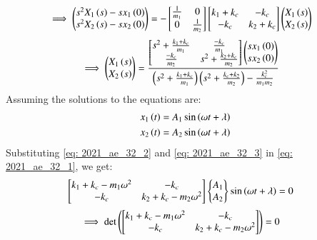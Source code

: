 \documentclass[journal,12pt,twocolumn]{IEEEtran}
\theoremstyle{remark}
\begin{document}
\newpage
\begin{align}
\implies \begin{pmatrix}
s^2 X_1\left(s\right)-sx_1\left(0\right)\\
s^2 X_2\left(s\right)-sx_2\left(0\right)
\end{pmatrix} &=-
\begin{bmatrix}
\frac{1}{m_1}&0\\
0&\frac{1}{m_2}\end{bmatrix}
\begin{bmatrix}
k_1+k_c&-k_c\\
-k_c&k_2+k_c\end{bmatrix}
\begin{pmatrix}
X_1\left(s\right)\\
X_2\left(s\right)
\end{pmatrix}
\end{align}
\begin{align}
\implies  \begin{pmatrix}
X_1\left(s\right)\\
X_2\left(s\right)
\end{pmatrix} &=
\frac{\begin{bmatrix}
s^2+\frac{k_1+k_c}{m_1}&\frac{-k_c}{m_1}\\
\frac{-k_c}{m_2}&s^2+\frac{k_2+k_c}{m_2}\end{bmatrix}
\begin{pmatrix}
sx_1\left(0\right)\\
sx_2\left(0\right)
\end{pmatrix}}
{\left(s^2+\frac{k_1+k_c}{m_1}\right)\left(s^2+\frac{k_c+k_2}{m_2}\right)-\frac{k_c^2}{m_1m_2}}
\end{align}
Assuming the solutions to the equations are:
\begin{align}
x_1\left(t\right) &= A_1\sin{\ensuremath{\left(\omega t+ \lambda\right)}} \label{eq: 2021_ae_32_2}\\
x_2\left(t\right) &= A_2\sin{\ensuremath{\left(\omega t+ \lambda\right)}} \label{eq: 2021_ae_32_3}
\end{align}
Substituting \eqref{eq: 2021_ae_32_2} and \eqref{eq: 2021_ae_32_3} in \eqref{eq: 2021_ae_32_1}, we get:
\begin{align}
\begin{bmatrix}
k_1+k_c- m_1\omega^2&-k_c\\
-k_c&k_2+k_c-m_2\omega^2\end{bmatrix}
\begin{Bmatrix}
A_1\\
A_2
\end{Bmatrix}
\sin{\ensuremath{\left(\omega t+ \lambda\right)}} &=0\label{eq: 2021_ae_32_4}
\end{align}
\begin{align}
\implies \det\left(\begin{bmatrix}
k_1+k_c- m_1\omega ^2&-k_c\\
-k_c&k_2+k_c-m_2\omega ^2\end{bmatrix}\right) &=0 \label{eq: 2021_ae_32_5}
\end{align}
\end{document}
